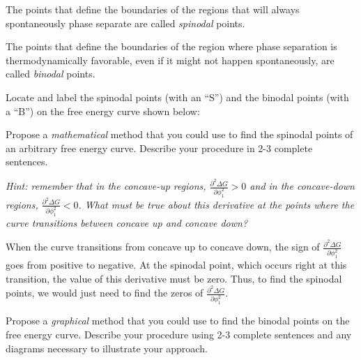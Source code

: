 \begin{activity}
\clearpage
\begin{infobox}
	The points that define the boundaries of the regions that will always spontaneously phase separate are called \emph{spinodal} points.
	
	The points that define the boundaries of the region where phase separation is thermodynamically favorable, even if it might not happen spontaneously, are called \emph{binodal} points.
\end{infobox}

\begin{ctqs}
	\question Locate and label the spinodal points (with an ``S'') and the binodal points (with a ``B'') on the free energy curve shown below:
	
		\begin{solution}[2.5in]
		\end{solution}
	
	\question Propose a \emph{mathematical} method that you could use to find the spinodal points of an arbitrary free energy curve.  Describe your procedure in 2-3 complete sentences.
	
		\emph{Hint: remember that in the concave-up regions, $\frac{\partial^2\Delta G}{\partial \phi_1^2} > 0$ and in the concave-down regions, $\frac{\partial^2\Delta G}{\partial \phi_1^2} < 0$.  What must be true about this derivative at the points where the curve transitions between concave up and concave down?}
		
		\begin{solution}[2.5in]
		
			When the curve transitions from concave up to concave down, the sign of $\frac{\partial^2\Delta G}{\partial \phi_1^2}$ goes from positive to negative.  At the spinodal point, which occurs right at this transition, the value of this derivative must be zero.  Thus, to find the spinodal points, we would just need to find the zeros of $\frac{\partial^2\Delta G}{\partial \phi_1^2}$.
		
		\end{solution}
		
	\question Propose a \emph{graphical} method that you could use to find the binodal points on the free energy curve.  Describe your procedure using 2-3 complete sentences and any diagrams necessary to illustrate your approach.
		\label{\labelbase:ctq:findbinodal}
		

\end{ctqs}
\end{activity}
